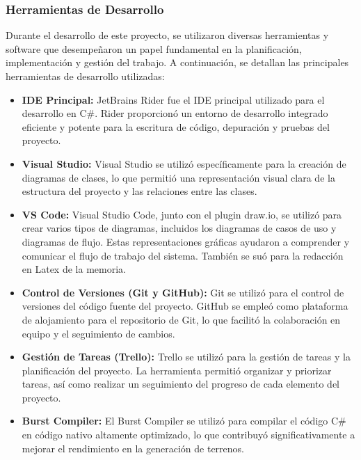 \subsubsection{Herramientas de Desarrollo}

Durante el desarrollo de este proyecto, se utilizaron diversas herramientas y software que desempeñaron un papel fundamental en la planificación, implementación y gestión del trabajo. A continuación, se detallan las principales herramientas de desarrollo utilizadas:

\begin{itemize}
    \item \textbf{IDE Principal:} JetBrains Rider fue el IDE principal utilizado para el desarrollo en C\#. Rider proporcionó un entorno de desarrollo integrado eficiente y potente para la escritura de código, depuración y pruebas del proyecto.
    
    \item \textbf{Visual Studio:} Visual Studio se utilizó específicamente para la creación de diagramas de clases, lo que permitió una representación visual clara de la estructura del proyecto y las relaciones entre las clases.
    
    \item \textbf{VS Code:} Visual Studio Code, junto con el plugin draw.io, se utilizó para crear varios tipos de diagramas, incluidos los diagramas de casos de uso y diagramas de flujo. Estas representaciones gráficas ayudaron a comprender y comunicar el flujo de trabajo del sistema. También se suó para la redacción en Latex de la memoria.
        
    \item \textbf{Control de Versiones (Git y GitHub):} Git se utilizó para el control de versiones del código fuente del proyecto. GitHub se empleó como plataforma de alojamiento para el repositorio de Git, lo que facilitó la colaboración en equipo y el seguimiento de cambios.
    
    \item \textbf{Gestión de Tareas (Trello):} Trello se utilizó para la gestión de tareas y la planificación del proyecto. La herramienta permitió organizar y priorizar tareas, así como realizar un seguimiento del progreso de cada elemento del proyecto.
    
    \item \textbf{Burst Compiler:} El Burst Compiler se utilizó para compilar el código C\# en código nativo altamente optimizado, lo que contribuyó significativamente a mejorar el rendimiento en la generación de terrenos.
\end{itemize}

